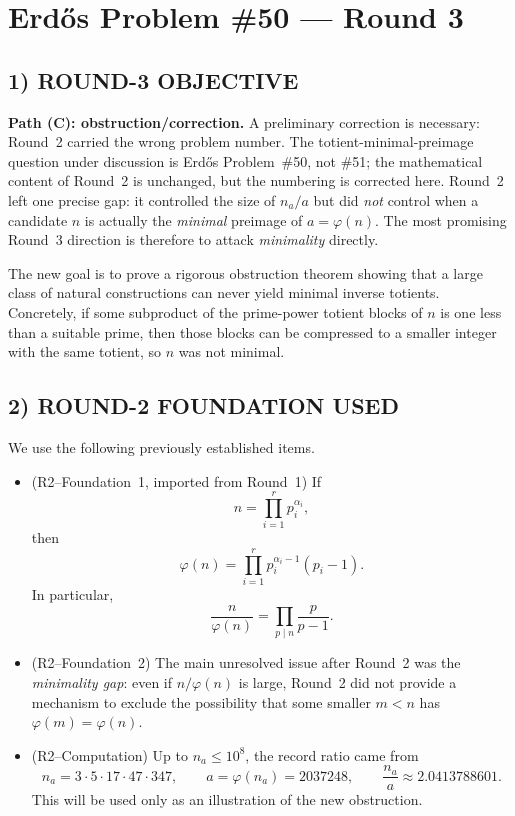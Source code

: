 \section{Erd\H{o}s Problem \#50 --- Round 3}

\subsection*{1) ROUND-3 OBJECTIVE}
\textbf{Path (C): obstruction/correction.}
A preliminary correction is necessary: Round~2 carried the wrong problem number. The totient-minimal-preimage question under discussion is Erd\H{o}s Problem~\#50, not \#51; the mathematical content of Round~2 is unchanged, but the numbering is corrected here.
Round~2 left one precise gap: it controlled the size of $n_a/a$ but did \emph{not} control when a candidate $n$ is actually the \emph{minimal} preimage of $a=\varphi(n)$. The most promising Round~3 direction is therefore to attack \emph{minimality} directly.

The new goal is to prove a rigorous obstruction theorem showing that a large class of natural constructions can never yield minimal inverse totients. Concretely, if some subproduct of the prime-power totient blocks of $n$ is one less than a suitable prime, then those blocks can be compressed to a smaller integer with the same totient, so $n$ was not minimal.

\subsection*{2) ROUND-2 FOUNDATION USED}
We use the following previously established items.
\begin{itemize}
\item (R2--Foundation~1, imported from Round~1) If
\[
 n=\prod_{i=1}^r p_i^{\alpha_i},
\]
then
\[
 \varphi(n)=\prod_{i=1}^r p_i^{\alpha_i-1}(p_i-1).
\]
In particular,
\[
 \frac{n}{\varphi(n)}=\prod_{p\mid n}\frac{p}{p-1}.
\]
\item (R2--Foundation~2) The main unresolved issue after Round~2 was the \emph{minimality gap}: even if $n/\varphi(n)$ is large, Round~2 did not provide a mechanism to exclude the possibility that some smaller $m<n$ has $\varphi(m)=\varphi(n)$.
\item (R2--Computation) Up to $n_a\le 10^8$, the record ratio came from
\[
 n_a=3\cdot 5\cdot 17\cdot 47\cdot 347,
\qquad
 a=\varphi(n_a)=2037248,
\qquad
 \frac{n_a}{a}\approx 2.0413788601.
\]
This will be used only as an illustration of the new obstruction.
\end{itemize}

